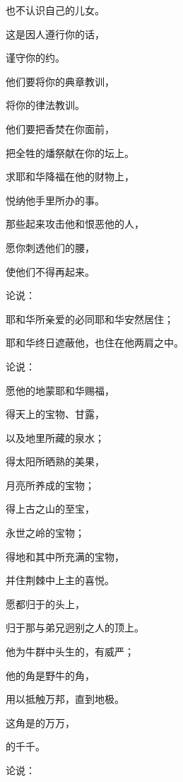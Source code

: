 {\par }{\Q 也不认识自己的儿女。
\par }{\Q 这是因{}人遵行你的话，
\par }{\Q 谨守你的约。
\par }{\Q {}他们要将你的典章教训{}，
\par }{\Q 将你的律法教训{}。
\par }{\Q 他们要把香焚在你面前，
\par }{\Q 把全牲的燔祭献在你的坛上。
\par }{\Q {}求耶和华降福在他的财物上，
\par }{\Q 悦纳他手里所办的事。
\par }{\Q 那些起来攻击他和恨恶他的人，
\par }{\Q 愿你刺透他们的腰，
\par }{\Q 使他们不得再起来。
\par }{\BB \par }{\Q {}论{}说：
\par }{\Q 耶和华所亲爱的必同耶和华安然居住；
\par }{\Q 耶和华终日遮蔽他，也住在他两肩之中。
\par }{\BB \par }{\Q {}论{}说：
\par }{\Q 愿他的地蒙耶和华赐福，
\par }{\Q 得天上的宝物、甘露，
\par }{\Q 以及地里所藏的泉水；
\par }{\Q {}得太阳所晒熟的美果，
\par }{\Q 月亮所养成的宝物；
\par }{\Q {}得上古之山的至宝，
\par }{\Q 永世之岭的宝物；
\par }{\Q {}得地和其中所充满的宝物，
\par }{\Q 并住荆棘中上主的喜悦。
\par }{\Q 愿{}都归于{}的头上，
\par }{\Q 归于那与弟兄迥别之人的顶上。
\par }{\Q {}他为牛群中头生的，有威严；
\par }{\Q 他的角是野牛的角，
\par }{\Q 用以抵触万邦，直到地极。
\par }{\Q 这角是{}的万万，
\par }{的千千。
\par }{\Q {}论{}说：
}
